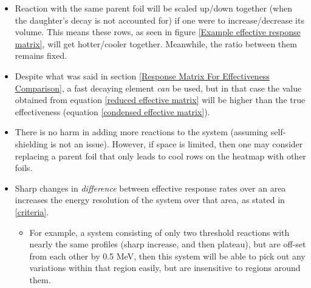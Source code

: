 \documentclass[a4paper, 12pt]{article}
\begin{document}
\begin{itemize}
    \item Reaction with the same parent foil will be scaled up/down together (when the daughter's decay is not accounted for) if one were to increase/decrease its volume. This means these rows, as seen in figure \ref{Example effective response matrix}, will get hotter/cooler together. Meanwhile, the ratio between them remains fixed.
    \item Despite what was said in section \ref{Response Matrix For Effectiveness Comparison}, a fast decaying element \emph{can} be used, but in that case the value obtained from equation \ref{reduced effective matrix} will be higher than the true effectiveness (equation \ref{condensed effective matrix}).
    \item There is no harm in adding more reactions to the system (assuming self-shielding is not an issue). However, if space is limited, then one may consider replacing a parent foil that only leads to cool rows on the heatmap with other foils.
    \item Sharp changes in \emph{difference} between effective response rates over an area increases the energy resolution of the system over that area, as stated in \ref{criteria}.
    \begin{itemize}
        \item For example, a system consisting of only two threshold reactions with nearly the same profiles (sharp increase, and then plateau), but are off-set from each other by 0.5 MeV, then this system will be able to pick out any variations within that region easily, but are insensitive to regions around them.
    \end{itemize}
\end{itemize}
\end{document}
